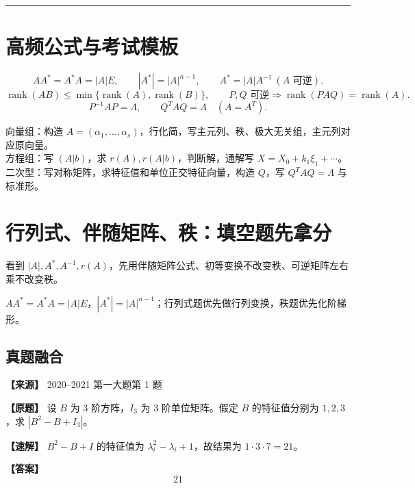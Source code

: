 \documentclass[11pt,a4paper,UTF8]{ctexart}
\newcommand{\rank}{\operatorname{rank}}
\begin{document}
\bigskip\hrule\bigskip

\section{高频公式与考试模板}

\begin{identifybox}[核心公式]
\[
AA^*=A^*A=|A|E,\qquad |A^*|=|A|^{n-1},\qquad A^*=|A|A^{-1}\ (A\text{ 可逆}).
\]
\[
\rank(AB)\le \min\{\rank(A),\rank(B)\},\qquad
P,Q\text{ 可逆}\Rightarrow \rank(PAQ)=\rank(A).
\]
\[
P^{-1}AP=\Lambda,\qquad Q^TAQ=\Lambda\quad(A=A^T).
\]
\end{identifybox}

\begin{templatebox}[大题给分模板]
向量组：构造 $A=(\alpha_1,\ldots,\alpha_s)$，行化简，写主元列、秩、极大无关组，主元列对应原向量。\\
方程组：写 $(A|b)$，求 $r(A),r(A|b)$，判断解，通解写 $X=X_0+k_1\xi_1+\cdots$。\\
二次型：写对称矩阵，求特征值和单位正交特征向量，构造 $Q$，写 $Q^TAQ=\Lambda$ 与标准形。
\end{templatebox}

\section{行列式、伴随矩阵、秩：填空题先拿分}

\begin{identifybox}[识别]
看到 $|A|,A^*,A^{-1},r(A)$，先用伴随矩阵公式、初等变换不改变秩、可逆矩阵左右乘不改变秩。
\end{identifybox}
\begin{templatebox}[考场模板]
$AA^*=A^*A=|A|E$，$|A^*|=|A|^{n-1}$；行列式题优先做行列变换，秩题优先化阶梯形。
\end{templatebox}

\subsection{真题融合}

\begin{answerbox}
\textbf{【来源】} 2020--2021 第一大题第 1 题

\textbf{【原题】}
设 $B$ 为 $3$ 阶方阵，$I_3$ 为 $3$ 阶单位矩阵。假定 $B$ 的特征值分别为 $1,2,3$，求 $\left|B^2-B+I_3\right|$。

\textbf{【速解】}
$B^2-B+I$ 的特征值为 $\lambda_i^2-\lambda_i+1$，故结果为 $1\cdot3\cdot7=21$。

\textbf{【答案】}
\[21\]
\end{answerbox}
\end{document}
